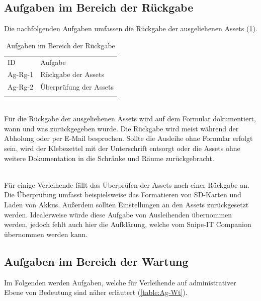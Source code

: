 \subsection{Aufgaben im Bereich der Rückgabe}
Die nachfolgenden Aufgaben umfassen die Rückgabe der ausgeliehenen Assets
(\ref{table:Ag-Rg}).
\begin{table}[h]
        \centering
        \caption{Aufgaben im Bereich der Rückgabe}
        \begin{tabular}{ll}
                \arrayrulecolor{maincolor}\hline
                \sffamily\color{maincolor}ID & \sffamily\color{maincolor}Aufgabe
                \\
                \arrayrulecolor{maincolor}\hline
                Ag-Rg-1                      & Rückgabe der Assets
                \\
                Ag-Rg-2                      & Überprüfung der Assets
                \\
                \arrayrulecolor{maincolor}\hline
        \end{tabular}
        \label{table:Ag-Rg}
\end{table}

{\sffamily\color{maincolor}{Ag-Rg-1 | Rückgabe der Assets}} \\
Für die Rückgabe der ausgeliehenen Assets wird auf dem Formular dokumentiert,
wann und was zurückgegeben wurde. Die Rückgabe wird meist während der Abholung
oder per E-Mail besprochen. Sollte die Ausleihe ohne Formular erfolgt sein, wird
der Klebezettel mit der Unterschrift entsorgt oder die Assets ohne weitere
Dokumentation in die Schränke und Räume zurückgebracht.

{\sffamily\color{maincolor}{Ag-Rg-2 | Überprüfung der Assets}}\\
Für einige Verleihende fällt das Überprüfen der Assets nach einer Rückgabe an.
Die Überprüfung umfasst beispielsweise das Formatieren von SD-Karten und Laden
von Akkus. Außerdem sollten Einstellungen an den Assets zurückgesetzt werden.
Idealerweise würde diese Aufgabe von Ausleihenden übernommen werden, jedoch
fehlt auch hier die Aufklärung, welche vom Snipe-IT Companion übernommen werden
kann.
\subsection{Aufgaben im Bereich der Wartung}
\label{subsec:wartung}
Im Folgenden werden Aufgaben, welche für Verleihende auf administrativer Ebene
von Bedeutung sind näher erläutert (\ref{table:Ag-Wt}).

